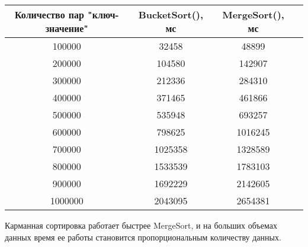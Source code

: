 \documentclass[12pt]{article}
\begin{document}
\begin{center}
\begin{tabular}{ |c|c|c|c| }
    \hline
    Количество пар "ключ-значение" & BucketSort(), мс & MergeSort(), мс  \\
    \hline
    100000 & 32458 & 48899   \\
    200000 & 104580 & 142907   \\
    300000 & 212336 & 284310   \\
    400000 & 371465 & 461866  \\
    500000 & 535948 & 693257  \\
    600000 & 798625 & 1016245   \\
    700000 & 1025358 & 1328589   \\
    800000 & 1533539 & 1783103   \\
    900000 & 1692229 & 2142605   \\
    1000000 & 2043095 & 2654381  \\


    \hline
    \end{tabular}
\end{center}

Карманная сортировка работает быстрее MergeSort, и на больших объемах данных время ее работы становится пропорциональным 
количеству данных.
\end{document}
